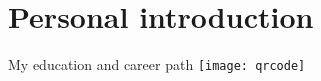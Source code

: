 \section{Personal introduction}


\begin{frame}[label=intro-1]{My education and career path \hfill \texttt{[image: qrcode]}}


\end{frame}
